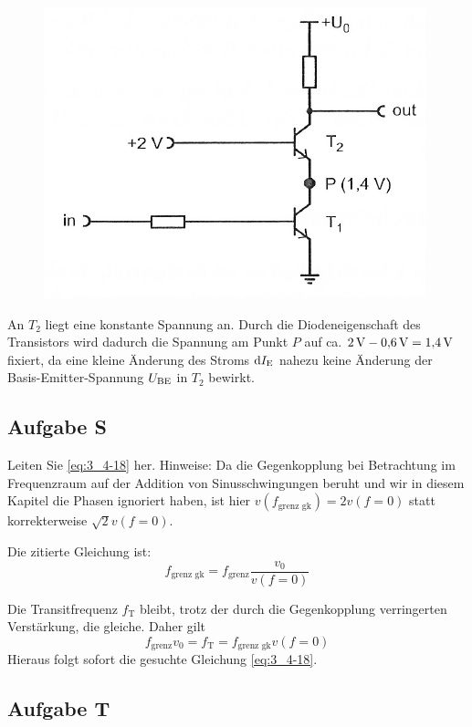 \begin{figure}[htbp]
	\centering
	\includegraphics[width=.6\textwidth]{Anleitung/3_4-15.png}
	\caption{%
		\cite[Abbildung~3/4.15]{physik313-Anleitung}
	}
	\label{fig:3_4-15}
\end{figure}

An $T_2$ liegt eine konstante Spannung an. Durch die Diodeneigenschaft des
Transistors wird dadurch die Spannung am Punkt $P$ auf ca. $\SI 2{\volt} -
\SI{0.6}{\volt} = \SI{1.4}{\volt}$ fixiert, da eine kleine Änderung des Stroms
$\dif\IE$ nahezu keine Änderung der Basis-Emitter-Spannung $U_\text{BE}$ in $T_2$
bewirkt.


\FloatBarrier
\subsection{Aufgabe S}

\begin{problem}
	Leiten Sie \eqref{eq:3_4-18} her. Hinweise: Da die Gegenkopplung bei
	Betrachtung im Frequenzraum auf der Addition von Sinusschwingungen beruht
	und wir in diesem Kapitel die Phasen ignoriert haben, ist hier
	$v(f_\text{grenz gk}) = 2v(f=0)$ statt korrekterweise $\sqrt 2 v (f = 0)$.
\end{problem}

Die zitierte Gleichung ist:
\begin{equation}
	\label{eq:3_4-18}
	f_\text{grenz gk} = f_\text{grenz} \frac{v_0}{v(f=0)}
\end{equation}

Die Transitfrequenz $f_\text{T}$ bleibt, trotz der durch die Gegenkopplung
verringerten Verstärkung, die gleiche. Daher gilt
\[f_\text{grenz}v_0 = f_\text{T} = f_\text{grenz gk} v(f=0)\]
Hieraus folgt sofort die gesuchte Gleichung \eqref{eq:3_4-18}.

\FloatBarrier
\subsection{Aufgabe T}


